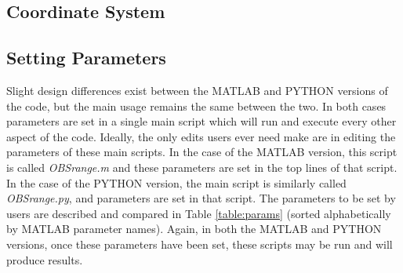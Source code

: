\documentclass[titlepage, 12pt]{article}
\begin{document}
  \subsection{Coordinate System}
  
  \subsection{Setting Parameters}
  \label{section:params}
  Slight design differences exist between the MATLAB and PYTHON versions of the code, but the main usage remains the same between the two. In both cases parameters are set in a single main script which will run and execute every other aspect of the code. Ideally, the only edits users ever need make are in editing the parameters of these main scripts. In the case of the MATLAB version, this script is called \textit{OBSrange.m} and these parameters are set in the top lines of that script. In the case of the PYTHON version, the main script is similarly called \textit{OBSrange.py}, and parameters are set in that script. The parameters to be set by users are described and compared in Table \ref{table:params} (sorted alphabetically by MATLAB parameter names).  Again, in both the MATLAB and PYTHON versions, once these parameters have been set, these scripts may be run and will produce results. 
\end{document}
